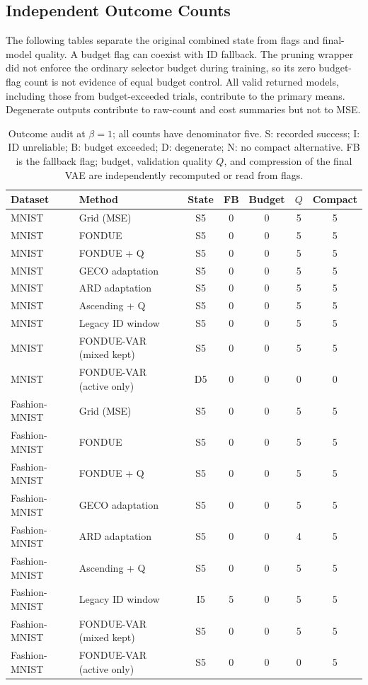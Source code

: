 \documentclass[make,article,submit,pdftex,moreauthors]{Definitions/mdpi}
\begin{document}
\subsection{Independent Outcome Counts}\label{app:outcomes}
The following tables separate the original combined state from flags and
final-model quality. A budget flag can coexist with ID fallback. The
pruning wrapper did not enforce the ordinary selector budget during
training, so its zero budget-flag count is not evidence of equal budget
control. All valid returned models, including those from budget-exceeded
trials, contribute to the primary means. Degenerate outputs contribute
to raw-count and cost summaries but not to MSE.
\begin{table}[H]
\caption{Outcome audit at $\beta=1$; all counts have denominator five. S: recorded success; I: ID unreliable; B: budget exceeded; D: degenerate; N: no compact alternative. FB is the fallback flag; budget, validation quality $Q$, and compression of the final VAE are independently recomputed or read from flags.}\label{tab:outcomes0}
\footnotesize
\setlength{\tabcolsep}{3.5pt}
\begin{tabular*}{\textwidth}{@{\extracolsep{\fill}}llccccc@{}}
\toprule
Dataset & Method & State & FB & Budget & $Q$ & Compact \\
\midrule
MNIST & Grid (MSE) & S5 & 0 & 0 & 5 & 5 \\
MNIST & FONDUE & S5 & 0 & 0 & 5 & 5 \\
MNIST & FONDUE + Q & S5 & 0 & 0 & 5 & 5 \\
MNIST & GECO adaptation & S5 & 0 & 0 & 5 & 5 \\
MNIST & ARD adaptation & S5 & 0 & 0 & 5 & 5 \\
MNIST & Ascending + Q & S5 & 0 & 0 & 5 & 5 \\
MNIST & Legacy ID window & S5 & 0 & 0 & 5 & 5 \\
MNIST & FONDUE-VAR (mixed kept) & S5 & 0 & 0 & 5 & 5 \\
MNIST & FONDUE-VAR (active only) & D5 & 0 & 0 & 0 & 0 \\
Fashion-MNIST & Grid (MSE) & S5 & 0 & 0 & 5 & 5 \\
Fashion-MNIST & FONDUE & S5 & 0 & 0 & 5 & 5 \\
Fashion-MNIST & FONDUE + Q & S5 & 0 & 0 & 5 & 5 \\
Fashion-MNIST & GECO adaptation & S5 & 0 & 0 & 5 & 5 \\
Fashion-MNIST & ARD adaptation & S5 & 0 & 0 & 4 & 5 \\
Fashion-MNIST & Ascending + Q & S5 & 0 & 0 & 5 & 5 \\
Fashion-MNIST & Legacy ID window & I5 & 5 & 0 & 5 & 5 \\
Fashion-MNIST & FONDUE-VAR (mixed kept) & S5 & 0 & 0 & 5 & 5 \\
Fashion-MNIST & FONDUE-VAR (active only) & S5 & 0 & 0 & 0 & 5 \\
\bottomrule
\end{tabular*}
\end{table}
\end{document}
